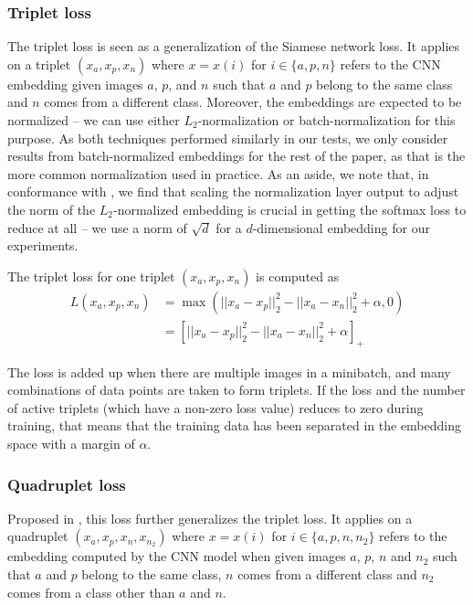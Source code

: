 \documentclass[10pt,twocolumn,letterpaper]{article}
\begin{document}
        \subsubsection{Triplet loss \label{sec:related_work:loss_fns:triplet_loss}}
            The triplet loss \cite{SchroffEtAl15} is seen as a generalization of the Siamese network loss\cite{chopra2005learning}. It applies on a triplet $(x_a, x_p, x_n)$ where $x = x(i)$ for $i \in \{a, p, n\}$ refers to the CNN embedding given images $a$, $p$, and $n$ such that $a$ and $p$ belong to the same class and $n$ comes from a different class. Moreover, the embeddings are expected to be normalized -- we can use either $L_2$-normalization or batch-normalization \cite{ioffe2015batch} for this purpose. As both techniques performed similarly in our tests, we only consider results from batch-normalized embeddings for the rest of the paper, as that is the more common normalization used in practice. As an aside, we note that, in conformance with \cite{DBLP:journals/corr/WangXCY17}, we find that scaling the normalization layer output to adjust the norm of the $L_2$-normalized embedding is crucial in getting the softmax loss to reduce at all -- we use a norm of $\sqrt{d}$ for a $d$-dimensional embedding for our experiments.
            
            The triplet loss for one triplet $(x_a, x_p, x_n)$ is computed as
            \begin{equation}\label{eq:Trip}
            \begin{split}
            L(x_a, x_p, x_n) & = \max(||x_a - x_p||_2^2 - ||x_a - x_n||_2^2 + \alpha, 0) \\
                             & = \left[||x_a - x_p||_2^2 - ||x_a - x_n||_2^2 + \alpha\right]_+
            \end{split}
            \end{equation}
            
            The loss is added up when there are multiple images in a minibatch, and many combinations of data points are taken to form triplets. If the loss and the number of active triplets (which have a non-zero loss value) reduces to zero during training, that means that the training data has been separated in the embedding space with a margin of $\alpha$.
        
        \subsubsection{Quadruplet loss \label{sec:related_work:loss_fns:quadruplet_loss}}
            Proposed in \cite{chen2017beyond}, this loss further generalizes the triplet loss. 
            It applies on a quadruplet $(x_a, x_p, x_n,  x_{n_2})$ where $x = x(i)$ for $i \in \{a, p, n, n_2\}$ refers to the embedding computed by the CNN model when given images $a$, $p$, $n$ and $n_2$ such that $a$ and $p$ belong to the same class, $n$ comes from a different class and $n_2$ comes from a class other than $a$ and $n$.
\end{document}
